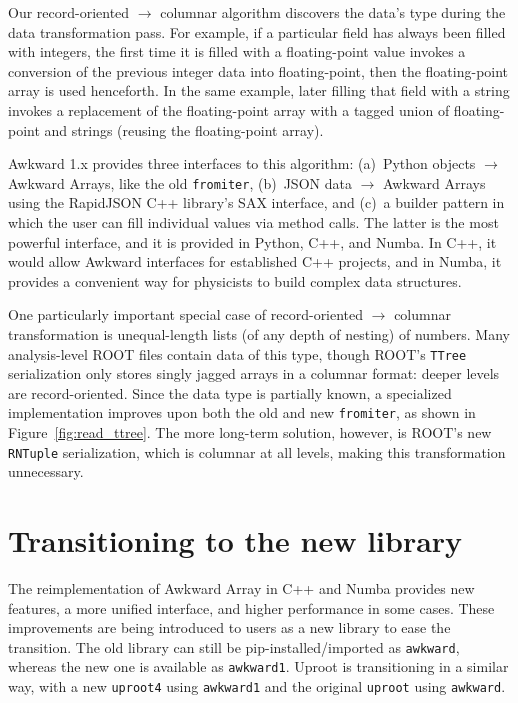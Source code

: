 \documentclass{webofc}
\begin{document}
Our record-oriented $\to$ columnar algorithm discovers the data's type during the data transformation pass. For example, if a particular field has always been filled with integers, the first time it is filled with a floating-point value invokes a conversion of the previous integer data into floating-point, then the floating-point array is used henceforth. In the same example, later filling that field with a string invokes a replacement of the floating-point array with a tagged union of floating-point and strings (reusing the floating-point array).

Awkward 1.x provides three interfaces to this algorithm: (a)~Python objects $\to$ Awkward Arrays, like the old \texttt{fromiter}, (b)~JSON data $\to$ Awkward Arrays using the RapidJSON C++ library's SAX interface, and (c)~a builder pattern in which the user can fill individual values via method calls. The latter is the most powerful interface, and it is provided in Python, C++, and Numba. In C++, it would allow Awkward interfaces for established C++ projects, and in Numba, it provides a convenient way for physicists to build complex data structures.

One particularly important special case of record-oriented $\to$ columnar transformation is unequal-length lists (of any depth of nesting) of numbers. Many analysis-level ROOT files contain data of this type, though ROOT's \texttt{TTree} serialization only stores singly jagged arrays in a columnar format: deeper levels are record-oriented. Since the data type is partially known, a specialized implementation improves upon both the old and new \texttt{fromiter}, as shown in Figure~\ref{fig:read_ttree}. The more long-term solution, however, is ROOT's new \texttt{RNTuple} serialization, which is columnar at all levels, making this transformation unnecessary.


\section{Transitioning to the new library}

The reimplementation of Awkward Array in C++ and Numba provides new features, a more unified interface, and higher performance in some cases. These improvements are being introduced to users as a new library to ease the transition. The old library can still be pip-installed/imported as \texttt{awkward}, whereas the new one is available as \texttt{awkward1}. Uproot is transitioning in a similar way, with a new \texttt{uproot4} using \texttt{awkward1} and the original \texttt{uproot} using \texttt{awkward}.
\end{document}
